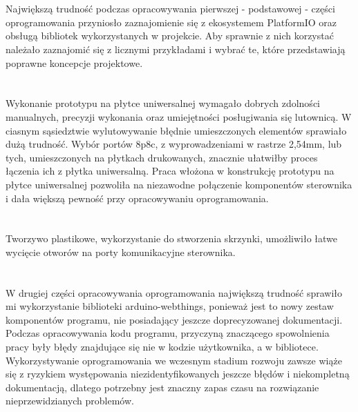 \documentclass[11pt]{report}
\begin{document}
\section{}
Największą trudność podczas opracowywania pierwszej - podstawowej - części oprogramowania przyniosło zaznajomienie się z ekosystemem PlatformIO oraz obsługą bibliotek wykorzystanych w projekcie. Aby sprawnie z nich korzystać należało zaznajomić się z licznymi przykładami i wybrać te, które przedstawiają poprawne koncepcje projektowe.

\section{}
Wykonanie prototypu na płytce uniwersalnej wymagało dobrych zdolności manualnych, precyzji wykonania oraz umiejętności posługiwania się lutownicą. W ciasnym sąsiedztwie wylutowywanie błędnie umieszczonych elementów sprawiało dużą trudność.
Wybór portów 8p8c, z wyprowadzeniami w rastrze 2,54mm, lub tych, umieszczonych na płytkach drukowanych, znacznie ułatwiłby proces łączenia ich z płytka uniwersalną.
Praca włożona w konstrukcję prototypu na płytce uniwersalnej pozwoliła na niezawodne połączenie komponentów sterownika i dała większą pewność przy opracowywaniu oprogramowania.

\section{}
Tworzywo plastikowe, wykorzystanie do stworzenia skrzynki, umożliwiło łatwe wycięcie otworów na porty komunikacyjne sterownika.

\section{}
W drugiej części opracowywania oprogramowania największą trudność sprawiło mi wykorzystanie biblioteki arduino-webthings, ponieważ jest to nowy zestaw komponentów programu, nie posiadający jeszcze doprecyzowanej dokumentacji. Podczas opracowywania kodu programu, przyczyną znaczącego spowolnienia pracy były błędy znajdujące się nie w kodzie użytkownika, a w bibliotece.
Wykorzystywanie oprogramowania we wczesnym stadium rozwoju zawsze wiąże się z ryzykiem występowania niezidentyfikowanych jeszcze błędów i niekompletną dokumentacją, dlatego potrzebny jest znaczny zapas czasu na rozwiązanie nieprzewidzianych problemów.
\end{document}
